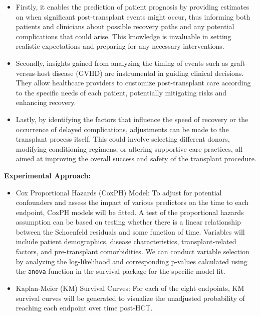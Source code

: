 \documentclass[11pt,]{article}
\providecommand{\tightlist}{%
  \setlength{\itemsep}{0pt}\setlength{\parskip}{0pt}}
\begin{document}
\begin{itemize}
\item
  Firstly, it enables the prediction of patient prognosis by providing
  estimates on when significant post-transplant events might occur, thus
  informing both patients and clinicians about possible recovery paths
  and any potential complications that could arise. This knowledge is
  invaluable in setting realistic expectations and preparing for any
  necessary interventions.
\item
  Secondly, insights gained from analyzing the timing of events such as
  graft-versus-host disease (GVHD) are instrumental in guiding clinical
  decisions. They allow healthcare providers to customize
  post-transplant care according to the specific needs of each patient,
  potentially mitigating risks and enhancing recovery.
\item
  Lastly, by identifying the factors that influence the speed of
  recovery or the occurrence of delayed complications, adjustments can
  be made to the transplant process itself. This could involve selecting
  different donors, modifying conditioning regimens, or altering
  supportive care practices, all aimed at improving the overall success
  and safety of the transplant procedure.
\end{itemize}

\textbf{Experimental Approach:}

\begin{itemize}
\tightlist
\item
  Cox Proportional Hazards (CoxPH) Model: To adjust for potential
  confounders and assess the impact of various predictors on the time to
  each endpoint, CoxPH models will be fitted. A test of the proportional
  hazards assumption can be based on testing whether there is a linear
  relationship between the Schoenfeld residuals and some function of
  time. Variables will include patient demographics, disease
  characteristics, transplant-related factors, and pre-transplant
  comorbidities. We can conduct variable selection by analyzing the
  log-likelihood and corresponding p-values calculated using the
  \texttt{anova} function in the survival package for the specific model
  fit.\\
\item
  Kaplan-Meier (KM) Survival Curves: For each of the eight endpoints, KM
  survival curves will be generated to visualize the unadjusted
  probability of reaching each endpoint over time post-HCT.
\end{itemize}
\end{document}
